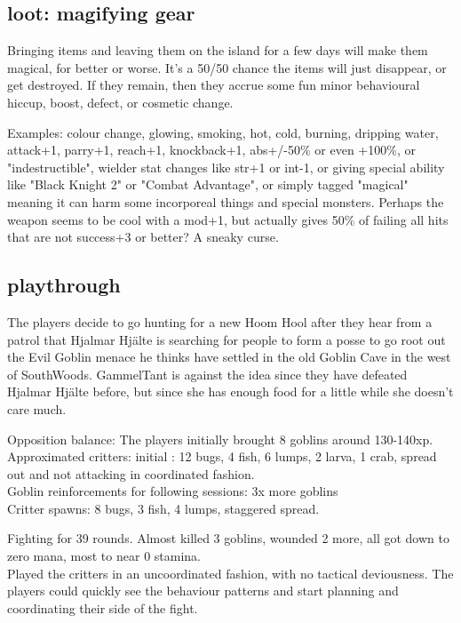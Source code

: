 \flushbottom


\subsection*{loot: magifying gear}
Bringing items and leaving them on the island for a few days will make them magical, for better or worse. It's a 50/50 chance the items will just disappear, or get destroyed. If they remain, then they accrue some fun minor behavioural hiccup, boost, defect, or cosmetic change.

Examples: colour change, glowing, smoking, hot, cold, burning, dripping water, attack+1, parry+1, reach+1, knockback+1, abs+/-50\% or even +100\%, or "indestructible", wielder stat changes like str+1 or int-1, or giving special ability like "Black Knight 2" or "Combat Advantage", or simply tagged "magical" meaning it can harm some incorporeal things and special monsters.
Perhaps the weapon seems to be cool with a mod+1, but actually gives 50\% of failing all hits that are not success+3 or better? A sneaky curse.


\subsection*{playthrough}
The players decide to go hunting for a new Hoom Hool after they hear from a patrol that Hjalmar Hjälte is searching for people to form a posse to go root out the Evil Goblin menace he thinks have settled in the old Goblin Cave in the west of SouthWoods. GammelTant is against the idea since they have defeated Hjalmar Hjälte before, but since she has enough food for a little while she doesn't care much.

Opposition balance: The players initially brought 8 goblins around 130-140xp.\\ Approximated critters: initial : 12 bugs, 4 fish, 6 lumps, 2 larva, 1 crab, spread out and not attacking in coordinated fashion.\\
Goblin reinforcements for following sessions: 3x more goblins\\
Critter spawns: 8 bugs, 3 fish, 4 lumps, staggered spread.

Fighting for 39 rounds. Almost killed 3 goblins, wounded 2 more, all got down to zero mana, most to near 0 stamina.\\
Played the critters in an uncoordinated fashion, with no tactical deviousness. The players could quickly see the behaviour patterns and start planning and coordinating their side of the fight.

